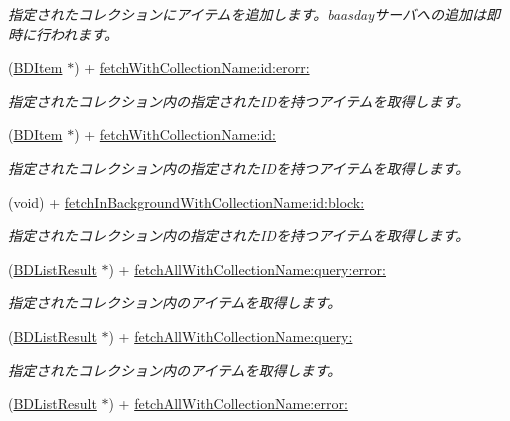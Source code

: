 \begin{DoxyCompactItemize}
\begin{DoxyCompactList}\small\item\em 指定されたコレクションにアイテムを追加します。baasdayサーバへの追加は即時に行われます。 \end{DoxyCompactList}\item 
(\hyperlink{interface_b_d_item}{B\-D\-Item} $\ast$) + \hyperlink{interface_b_d_item_a958919b152115ef67aa318aef7bb53cb}{fetch\-With\-Collection\-Name\-:id\-:erorr\-:}
\begin{DoxyCompactList}\small\item\em 指定されたコレクション内の指定された\-I\-Dを持つアイテムを取得します。 \end{DoxyCompactList}\item 
(\hyperlink{interface_b_d_item}{B\-D\-Item} $\ast$) + \hyperlink{interface_b_d_item_ad5e8d0f4de6c4b6eb89ddcf079445ec6}{fetch\-With\-Collection\-Name\-:id\-:}
\begin{DoxyCompactList}\small\item\em 指定されたコレクション内の指定された\-I\-Dを持つアイテムを取得します。 \end{DoxyCompactList}\item 
(void) + \hyperlink{interface_b_d_item_a9eefd58d4fee746fa9e3c8de5c212e90}{fetch\-In\-Background\-With\-Collection\-Name\-:id\-:block\-:}
\begin{DoxyCompactList}\small\item\em 指定されたコレクション内の指定された\-I\-Dを持つアイテムを取得します。 \end{DoxyCompactList}\item 
(\hyperlink{interface_b_d_list_result}{B\-D\-List\-Result} $\ast$) + \hyperlink{interface_b_d_item_a07190d60ff7e26fdaa86d873e6d21304}{fetch\-All\-With\-Collection\-Name\-:query\-:error\-:}
\begin{DoxyCompactList}\small\item\em 指定されたコレクション内のアイテムを取得します。 \end{DoxyCompactList}\item 
(\hyperlink{interface_b_d_list_result}{B\-D\-List\-Result} $\ast$) + \hyperlink{interface_b_d_item_a00666b4a26a8bb9c7af9d13f34ca2a67}{fetch\-All\-With\-Collection\-Name\-:query\-:}
\begin{DoxyCompactList}\small\item\em 指定されたコレクション内のアイテムを取得します。 \end{DoxyCompactList}\item 
(\hyperlink{interface_b_d_list_result}{B\-D\-List\-Result} $\ast$) + \hyperlink{interface_b_d_item_aa9365db8105ba17db77eb9b96d77a2f4}{fetch\-All\-With\-Collection\-Name\-:error\-:}

\end{DoxyCompactItemize}
